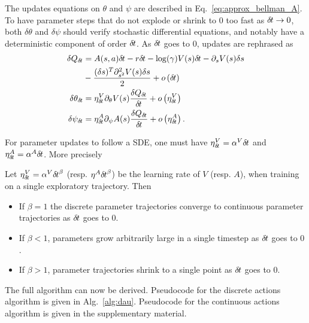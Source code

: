 The updates equations on $\theta$ and $\psi$ are described in
Eq.~\eqref{eq:approx_bellman_A}.  To have parameter steps that do not explode or shrink to $0$ too
fast as ${\delta\hspace{-.1em}t} \rightarrow 0$, both $\delta \theta$ and
$\delta \psi$ should verify stochastic differential equations, and notably
have a deterministic component of order ${\delta\hspace{-.1em}t}$. As ${\delta\hspace{-.1em}t}$ goes to $0$,
updates are rephrased as
\begin{align}
	\delta Q_{\delta\hspace{-.1em}t} &= A(s, a){\delta\hspace{-.1em}t} - r{\delta\hspace{-.1em}t} - \log(\gamma) V(s){\delta\hspace{-.1em}t} - \partial_s V(s) \delta s\nonumber \\&- \frac{(\delta s)^T \partial_{s^2}^2 V(s) \delta s}{2} + o\left({\delta\hspace{-.1em}t}\right)\\
	\delta \theta_{\delta\hspace{-.1em}t} &= \eta^V_{\delta\hspace{-.1em}t} \partial_{\theta} V(s) \frac{\delta Q_{\delta\hspace{-.1em}t}}{{\delta\hspace{-.1em}t}} + o\left(\eta^V_{\delta\hspace{-.1em}t}\right)\\
	\delta \psi_{\delta\hspace{-.1em}t} &= \eta^A_{\delta\hspace{-.1em}t} \partial_{\psi} A(s) \frac{\delta Q_{\delta\hspace{-.1em}t}}{{\delta\hspace{-.1em}t}} + o\left(\eta^A_{\delta\hspace{-.1em}t}\right).
\end{align}


For parameter updates to follow a SDE, one must
have $\eta^V_{\delta\hspace{-.1em}t} = \alpha^V {\delta\hspace{-.1em}t}$ and $\eta^A_{\delta\hspace{-.1em}t} = \alpha^A
{\delta\hspace{-.1em}t}$. More precisely
\begin{theorem}
	Let $\eta^V_{\delta\hspace{-.1em}t} = \alpha^V {\delta\hspace{-.1em}t}^\beta$ (resp. $\eta^A {\delta\hspace{-.1em}t}^\beta$) be the learning rate
	of $V$ (resp. $A$), when training on a single exploratory trajectory. Then
	\begin{itemize}
		\item If $\beta = 1$ the discrete parameter trajectories converge to continuous parameter
			trajectories as ${\delta\hspace{-.1em}t}$ goes to $0$.
		\item If $\beta < 1$, parameters grow arbitrarily large in a single timestep as ${\delta\hspace{-.1em}t}$
			goes to $0$.
		\item If $\beta > 1$, parameter trajectories shrink to a single point as 
			${\delta\hspace{-.1em}t}$ goes to $0$.
	\end{itemize}
	\label{th:cont-params}
\end{theorem}

The full algorithm can now be derived.
Pseudocode for the discrete actions algorithm is given in Alg.~\ref{alg:dau}.
Pseudocode for the continuous actions algorithm is given in the supplementary
material.

